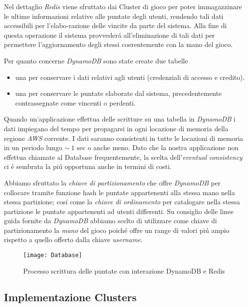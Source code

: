 \documentclass{sig-alternate-05-2015}
\begin{document}
Nel dettaglio \textit{Redis} viene sfruttato dai Cluster di gioco per poter immagazzinare le ultime informazioni relative alle puntate degli utenti, rendendo tali dati accessibili per l'elabo-razione delle vincite da parte del sistema. Alla fine di questa operazione il sistema provveder\'a all'eliminazione di tali dati per permettere l'aggiornamento degli stessi coerentemente con la mano del gioco.

Per quanto concerne \textit{DynamoDB} sono state create due tabelle
\begin{itemize}
\item  una per conservare i dati relativi agli utenti (credenziali di accesso e credito).
\item  una per conservare le puntate elaborate dal sistema, precedentemente contrassegnate come vincenti o perdenti.
\end{itemize}
Quando un'applicazione effettua delle scritture su una tabella in \textit{DynamoDB} i dati impiegano del tempo per propagarsi in ogni locazione di memoria della regione \textit{AWS} corrente. I dati saranno consistenti in tutte le locazioni di memoria in un periodo lungo \begin{math}\sim{~1}\end{math} sec o anche meno.
Dato che la nostra applicazione non effettua chiamate al Database frequentemente, la scelta dell'\textit{eventual consistency} ci \'e sembrata la pi\'u opportuna anche in termini di costi.

Abbiamo sfruttato la \textit{chiave di partizionamento} che offre \textit{DynamoDB} per collocare tramite funzione hash le puntate appartenenti alla stessa mano nella stessa partizione; cos\'i come la \textit{chiave di ordinamento} per catalogare nella stessa partizione le puntate appartenenti ad utenti differenti.
Su consiglio delle linee guida fornite da \textit{DynamoDB} abbiamo scelto di utilizzare come chiave di partizionamento la \textit{mano} del gioco poich\'e offre un range di valori pi\'u ampio rispetto a quello offerto dalla chiave \textit{username}. 

\begin{figure}\centering
 \texttt{[image: Database]} 
 \caption{Processo scrittura delle puntate con interazione DynamoDB e Redis} \label{nome} 
 \end{figure}
 
\subsection{Implementazione Clusters}
\end{document}
